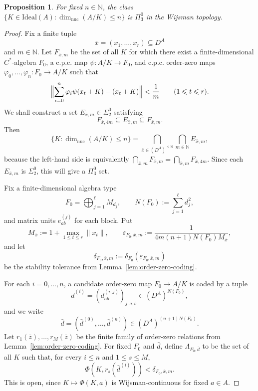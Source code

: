 \documentclass[12pt,fleqn,a4paper]{amsart}
\renewcommand{\le}{\leqslant}
\numberwithin{equation}{section}
\newtheorem{proposition}[theorem]{Proposition}
\theoremstyle{definition}
\newcommand{\N}{\mathbb{N}}
\newcommand{\Ideal}{\mathrm{Ideal}}
\begin{document}
\begin{proposition}\label{prop:nucdim}
For fixed $n\in\N$, the class
$\{K\in\Ideal(A):\dim_{\mathrm{nuc}}(A/K)\le n\}$ is $\Pi^0_3$
in the Wijsman topology.
\end{proposition}

\begin{proof}
Fix a finite tuple
\[
\bar x=(x_1,\dots,x_r)\subseteq D^A
\]
and $m\in\N$.  Let $F_{\bar x,m}$ be the set of all $K$ for which there exist a
finite-dimensional $C^*$-algebra $F_0$, a c.p.c. map
$\psi:A/K\to F_0$, and c.p.c. order-zero maps
$\varphi_0,\dots,\varphi_n:F_0\to A/K$ such that
\[
\Bigl\|\sum_{i=0}^{n}\varphi_i\psi(x_t+K)-(x_t+K)\Bigr\|<\frac1m
\qquad (1\le t\le r).
\]
We shall construct a set $E_{\bar x,m}\in\Sigma^0_2$ satisfying
\[
        F_{\bar x,4m}\subseteq E_{\bar x,m}\subseteq F_{\bar x,m}.        \tag{*}
\]
Then
\[
\{K:\dim_{\mathrm{nuc}}(A/K)\le n\}
=
\bigcap_{\bar x\in(D^A)^{<\N}}\bigcap_{m\in\N} E_{\bar x,m},
\]
because the left-hand side is equivalently
$\bigcap_{\bar x,m}F_{\bar x,m}=\bigcap_{\bar x,m}F_{\bar x,4m}$.  Since each
$E_{\bar x,m}$ is $\Sigma^0_2$, this will give a $\Pi^0_3$ set.

Fix a finite-dimensional algebra type
\[
F_0=\bigoplus_{j=1}^{\ell}M_{d_j},
\qquad
N(F_0):=\sum_{j=1}^{\ell}d_j^2,
\]
and matrix units $e_{ab}^{(j)}$ for each block.  Put
\[
M_{\bar x}:=1+\max_{1\le t\le r}\|x_t\|,
\qquad
\varepsilon_{F_0,\bar x,m}:=
\frac{1}{4m(n+1)N(F_0)M_{\bar x}},
\]
and let
\[
\delta_{F_0,\bar x,m}:=\delta_{F_0}(\varepsilon_{F_0,\bar x,m})
\]
be the stability tolerance from Lemma~\ref{lem:order-zero-coding}.

For each $i=0,\dots,n$, a candidate order-zero map $F_0\to A/K$ is coded by a tuple
\[
\bar d^{(i)}=(d_{ab}^{(i,j)})_{j,a,b}\in(D^A)^{N(F_0)},
\]
and we write
\[
\bar d=(\bar d^{(0)},\dots,\bar d^{(n)})\in(D^A)^{(n+1)N(F_0)}.
\]
Let $r_1(\bar z),\dots,r_M(\bar z)$ be the finite family of order-zero relations from
Lemma~\ref{lem:order-zero-coding}.  For fixed $F_0$ and $\bar d$, define
$\Lambda_{F_0,\bar d}$ to be the set of all $K$ such that, for every $i\le n$ and
$1\le s\le M$,
\[
        \Phi(K,r_s(\bar d^{(i)}))<\delta_{F_0,\bar x,m}.
\]
This is open, since $K\mapsto\Phi(K,a)$ is Wijsman-continuous for fixed $a\in A$.


\end{proof}
\end{document}
